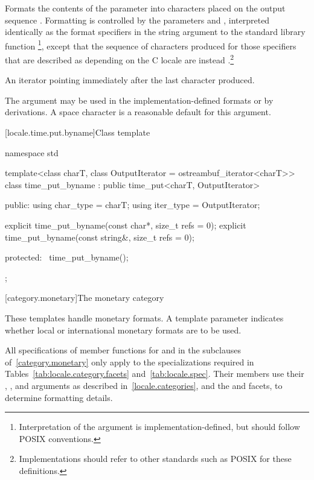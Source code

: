 \begin{itemdescr}
\pnum
\effects
Formats the contents of the parameter 
into characters placed on the output sequence .
Formatting is controlled by the parameters  and ,
interpreted identically as the format specifiers in the string
argument to the standard library function
%
\footnote{Interpretation of the 
argument is implementation-defined, but should follow POSIX
conventions.},
except that the sequence of characters produced for those specifiers
that are described as depending on the C locale are instead .\footnote{Implementations should refer to other standards
such as POSIX
for these definitions.}

\pnum
\returns
An iterator pointing immediately after the last character produced.
\begin{note}
The  argument may be used in the implementation-defined
formats or by derivations. A space character is a reasonable
default for this argument.
\end{note}
\end{itemdescr}

[locale.time.put.byname]{Class template }

%
\begin{codeblock}
namespace std {
  template<class charT, class OutputIterator = ostreambuf_iterator<charT>>
    class time_put_byname : public time_put<charT, OutputIterator> {
    public:
      using char_type = charT;
      using iter_type = OutputIterator;

      explicit time_put_byname(const char*, size_t refs = 0);
      explicit time_put_byname(const string&, size_t refs = 0);

    protected:
      ~time_put_byname();
    };
}
\end{codeblock}

[category.monetary]{The monetary category}

\pnum
These templates handle monetary formats.
A template parameter indicates whether
local or international monetary formats are to be used.

\pnum
All specifications of member functions for
and
in the subclauses of~\ref{category.monetary} only apply to the
specializations required in Tables~\ref{tab:locale.category.facets}
and~\ref{tab:locale.spec}.
Their members use their
,
,
and
arguments as described in~\ref{locale.categories}, and the
and
facets, to determine formatting details.

